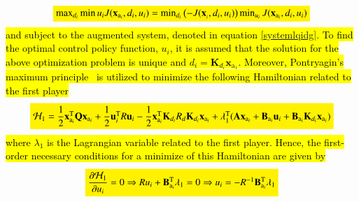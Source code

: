 \documentclass[3p]{elsarticle}
\begin{document}
\begin{equation}
    \colorbox{yellow}{$\max_{d_i}\min{u_i} J(\mathbf{x}_{\mathrm{a}_i}, d_i, u_i) = \min_{d_i}\left(-J(\mathbf{x}_{_i}, d_i, u_i)\right)\min_{u_i}J(\mathbf{x}_{\mathrm{a}_i}, d_i, u_i)$}
\end{equation}
\hl{and subject to the augmented system, denoted in equation {\eqref{systemlqidg}}. To find the optimal control policy function, $u_i$, it is assumed that the solution for the above optimization problem is unique and $d_i = \mathbf{K}_{d_i}\mathbf{x}_{\mathrm{a}_1}$.
Moreover, Pontryagin's maximum principle~{\cite{kirk2004optimal}} is utilized to minimize the following Hamiltonian related to the first player}
\begin{equation}
    \colorbox{yellow}{$\mathcal{H}_1 = \dfrac{1}{2}\mathbf{x}_{\mathrm{a}_i}^\mathrm{T} \mathbf{Q} \mathbf{x}_{\mathrm{a}_i} + \dfrac{1}{2}\mathbf{u}_i^\mathrm{T} R \mathbf{u}_i - \dfrac{1}{2}\mathbf{x}_{\mathrm{a}_i}^\mathrm{T} \mathbf{K}_{d_i} R_{d} \mathbf{K}_{d_i}  \mathbf{x}_{\mathrm{a}_i} + \lambda_1^\mathrm{T}(\mathbf{A}\mathbf{x}_{\mathrm{a}_i} + \mathbf{B}_{\mathrm{a}_i}\mathbf{u}_i + \mathbf{B}_{\mathrm{a}_i}\mathbf{K}_{d_i}\mathbf{x}_{\mathrm{a}_i})$}
\end{equation}
    \hl{where $\lambda_1$ is the Lagrangian variable related to the first player. Hence, the first-order necessary conditions for a minimize of this Hamiltonian are given by}
    \begin{equation}\label{eq:Hamiltonian_u}
        \colorbox{yellow}{$\dfrac{\partial \mathcal{H}_1}{\partial u_i} = 0 \Rightarrow Ru_i + \mathbf{B}_{\mathrm{a}_i}^\mathrm{T}\lambda_1 = 0 \Rightarrow u_i = -R^{-1}\mathbf{B}_{\mathrm{a}_i}^\mathrm{T}\lambda_1$}
    \end{equation}
    
\end{document}
